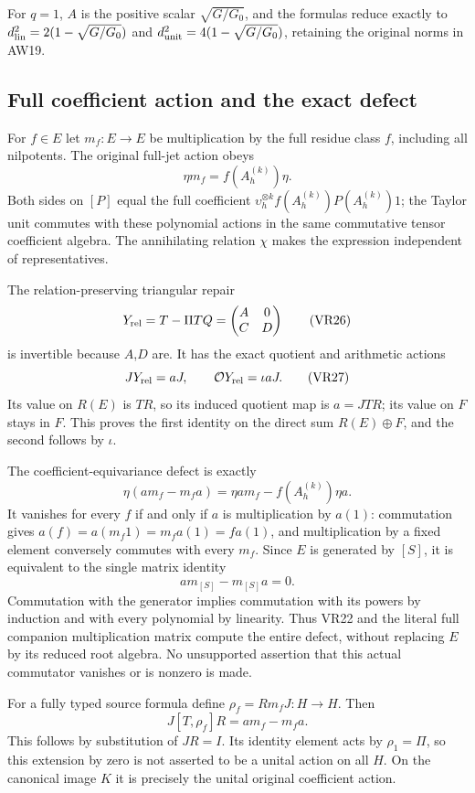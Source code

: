 For \(q=1\), \(A\) is the positive scalar \(\sqrt{G/G_0}\), and the formulas reduce exactly to
\(d_{\rm lin}^2=2(1-\sqrt{G/G_0})\) and
\(d_{\rm unit}^2=4(1-\sqrt{G/G_0})\), retaining the original norms in AW19.

\subsection{Full coefficient action and the exact defect}

For \(f\in E\) let \(m_f:E\to E\) be multiplication by the full residue class \(f\), including all nilpotents. The original full-jet action obeys
\[
 \eta m_f=f(A_h^{(k)})\eta. \tag{VR25}
\]
Both sides on \([P]\) equal the full coefficient
\(\upsilon_h^{\otimes k} f(A_h^{(k)})P(A_h^{(k)})1\);
the Taylor unit commutes with these polynomial actions in the same commutative tensor coefficient algebra. The annihilating relation \(\chi\) makes the expression independent of representatives.

The relation-preserving triangular repair
\[
 Y_{\rm rel}=T-\Pi TQ=\begin{pmatrix}A&0\\C&D\end{pmatrix}
 \tag{VR26}
\]
is invertible because \(A\),\(D\) are. It has the exact quotient and arithmetic actions
\[
 JY_{\rm rel}=aJ,\qquad
 \mathcal OY_{\rm rel}=\iota aJ. \tag{VR27}
\]
Its value on \(R(E)\) is \(TR\), so its induced quotient map is \(a=JTR\); its value on \(F\) stays in \(F\). This proves the first identity on the direct sum \(R(E)\oplus F\), and the second follows by \(\iota\).

The coefficient-equivariance defect is exactly
\[
 \eta(am_f-m_fa)
 =\eta a m_f-f(A_h^{(k)})\eta a. \tag{VR28}
\]
It vanishes for every \(f\) if and only if \(a\) is multiplication by \(a(1)\): commutation gives \(a(f)=a(m_f1)=m_fa(1)=fa(1)\), and multiplication by a fixed element conversely commutes with every \(m_f\). Since \(E\) is generated by \([S]\), it is equivalent to the single matrix identity
\[
 a m_{[S]}-m_{[S]}a=0. \tag{VR29}
\]
Commutation with the generator implies commutation with its powers by induction and with every polynomial by linearity. Thus VR22 and the literal full companion multiplication matrix compute the entire defect, without replacing \(E\) by its reduced root algebra. No unsupported assertion that this actual commutator vanishes or is nonzero is made.

For a fully typed source formula define
\(\rho_f=Rm_fJ:H\to H\). Then
\[
 J[T,\rho_f]R=am_f-m_fa. \tag{VR30}
\]
This follows by substitution of \(JR=I\). Its identity element acts by \(\rho_1=\Pi\), so this extension by zero is not asserted to be a unital action on all \(H\). On the canonical image \(K\) it is precisely the unital original coefficient action.

